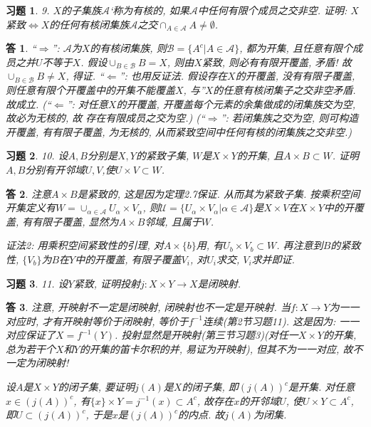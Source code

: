 \documentclass{ctexart}%
\newtheorem*{exercise}{习题}
\newtheorem*{solution}{答}
\theoremstyle{definition}
\theoremstyle{remark}
\begin{document}
\begin{exercise} 9. $X$的子集族$\mathscr{A}$`称为有核的, 如果$\mathscr{A}$中任何有限个成员之交非空. 证明: $X$紧致$\Longleftrightarrow X$的任何有核闭集族$\mathscr{A}$之交$\cap_{A\in\mathscr{A}}A\neq \emptyset$.
\end{exercise}
\begin{solution}
``$\Longrightarrow$'': $\mathscr{A}$为$X$的有核闭集族, 则$\mathscr{B}=\{A^c|A \in \mathscr{A}\}$, 都为开集, 且任意有限个成员之并$U$不等于$X$. 假设$\cup_{B\in \mathscr{B}} B=X$, 则由$X$紧致, 则必有有限开覆盖, 矛盾! 故$\cup_{B\in \mathscr{B}} B\neq X$, 得证. ``$\Longleftarrow$'': 也用反证法. 假设存在$X$的开覆盖, 没有有限子覆盖, 则任意有限个开覆盖中的开集不能覆盖$X$, 与''$X$的任意有核闭集子之交非空矛盾. 故成立. (``$\Longleftarrow$'': 对任意$X$的开覆盖, 开覆盖每个元素的余集做成的闭集族交为空, 故必为无核的, 故
存在有限成员之交为空.) (``$\Longrightarrow$'': 若闭集族之交为空, 则可构造开覆盖, 有有限子覆盖, 为无核的, 从而紧致空间中任何有核的闭集族之交非空.)
\end{solution}

\begin{exercise}10. 设$A,B$分别是$X,Y$的紧致子集, $W$是$X\times Y$的开集, 且$A\times B\subset W$. 证明$A,B$分别有开邻域$U,V$,使$U\times V\subset  W$. 
\end{exercise}
\begin{solution}
注意$A\times B$是紧致的, 这是因为定理2.7保证. 从而其为紧致子集. 按乘积空间开集定义有$W=\cup_{\alpha\in\mathscr{A}} U_\alpha\times V_\alpha$, 则$\mathscr{U}=\{
U_\alpha\times V_\alpha|\alpha\in\mathscr{A}\}$是$X\times V$在$X\times Y$中的开覆盖, 有有限子覆盖, 显然为$A\times B$邻域, 且属于$W$.

证法2: 用乘积空间紧致性的引理, 对$A\times \{b\}$用, 有$U_b\times V_b\subset W$. 再注意到$B$的紧致性, $\{V_b\}$为$B$在$Y$中的开覆盖, 有限子覆盖$V_i$, 对$U_i$求交, $V_i$求并即证. 
\end{solution}


\begin{exercise}11. 设$Y$紧致, 证明投射$j:X\times Y\rightarrow X$是闭映射.
\end{exercise}
\begin{solution}
注意, 开映射不一定是闭映射, 闭映射也不一定是开映射. 当$f:X\rightarrow Y$为一一对应时, 才有开映射等价于闭映射, 等价于$f^{-1}$连续(第2节习题11). 这是因为: 一一对应保证了$X=f^{-1}(Y)$. 投射显然是开映射(第三节习题3)(对任一$X\times Y$的开集, 总为若干个$X$和$Y$的开集的笛卡尔积的并, 易证为开映射), 但其不为一一对应, 故不一定为闭映射! 

设$A$是$X\times Y$的闭子集, 要证明$j(A)$是$X$的闭子集, 即$(j(A))^c$是开集. 对任意$x\in (j(A))^c$, 有$\{x\}\times Y =j^{-1}(x)\subset A^c$, 故存在$x$的开邻域$U$, 使$U\times Y\subset A^c$, 即$U\subset (j(A))^c$, 于是$x$是$(j(A))^c$的内点. 故$j(A)$为闭集. 
\end{solution}
\end{document}
